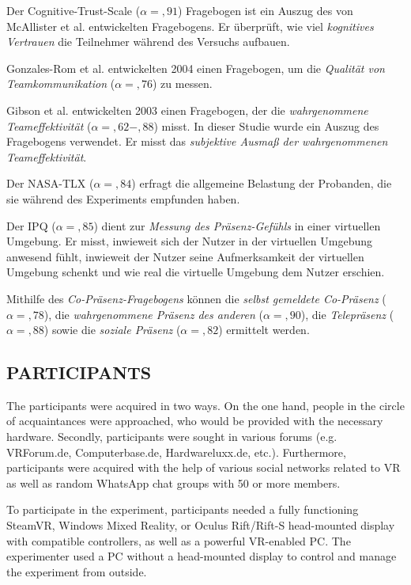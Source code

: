 \documentclass[sigchi]{acmart}
\begin{document}
Der Cognitive-Trust-Scale ($\alpha =,91$) Fragebogen ist ein Auszug des von McAllister et al. \citep[S. 37]{mcallister1995affect} entwickelten Fragebogens. Er überprüft, wie viel \textit{kognitives Vertrauen} die Teilnehmer während des Versuchs aufbauen.

Gonzales-Rom et al. \citep[S. 1049]{gonzalez2014climate} entwickelten 2004 einen Fragebogen, um die \textit{Qualität von Teamkommunikation} ($\alpha =,76$) zu messen.

Gibson et al. \citep[S. 469]{gibson2003team} entwickelten 2003 einen Fragebogen, der die \textit{wahrgenommene Teameffektivität} ($\alpha =,62-,88$) misst. In dieser Studie wurde ein Auszug des Fragebogens verwendet. Er misst das \textit{subjektive Ausmaß der wahrgenommenen Teameffektivität}.

Der NASA-TLX ($\alpha =,84$) erfragt die allgemeine Belastung der Probanden, die sie während des Experiments empfunden haben. 

Der IPQ ($\alpha =,85$) dient zur \textit{Messung des Präsenz-Gefühls} in einer virtuellen Umgebung. Er misst, inwieweit sich der Nutzer in der virtuellen Umgebung anwesend fühlt, inwieweit der Nutzer seine Aufmerksamkeit der virtuellen Umgebung schenkt und wie real die virtuelle Umgebung dem Nutzer erschien. 

Mithilfe des \textit{Co-Präsenz-Fragebogens} können die \textit{selbst gemeldete Co-Präsenz} ($\alpha =,78$), die \textit{wahrgenommene Präsenz des anderen} ($\alpha =,90$), die \textit{Telepräsenz} ($\alpha =,88$) sowie die \textit{soziale Präsenz} ($\alpha =,82$) ermittelt werden.
\subsection{PARTICIPANTS}

The participants were acquired in two ways. On the one hand, people in the circle of acquaintances were approached, who would be provided with the necessary hardware. Secondly, participants were sought in various forums (e.g. VRForum.de, Computerbase.de, Hardwareluxx.de, etc.). Furthermore, participants were acquired with the help of various social networks related to VR as well as random WhatsApp chat groups with 50 or more members.

To participate in the experiment, participants needed a fully functioning SteamVR, Windows Mixed Reality, or Oculus Rift/Rift-S head-mounted display with compatible controllers, as well as a powerful VR-enabled PC. The experimenter used a PC without a head-mounted display to control and manage the experiment from outside.
\end{document}
